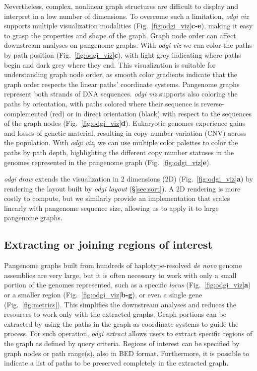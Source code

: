 \documentclass{bioinfo}
\begin{document}
Nevertheless, complex, nonlinear graph structures are difficult to display and interpret in a low number of dimensions.
To overcome such a limitation, \textit{odgi viz} supports multiple visualization modalities (Fig.~\ref{fig:odgi_viz}\textbf{c-e}), making it easy to grasp the properties and shape of the graph.
Graph node order can affect downstream analyses on pangenome graphs.
With \textit{odgi viz} we can color the paths by path position (Fig.~\ref{fig:odgi_viz}\textbf{c}), with light grey indicating where paths begin and dark grey where they end.
This visualization is suitable for understanding graph node order, as smooth color gradients indicate that the graph order respects the linear paths' coordinate systems.
Pangenome graphs represent both strands of DNA sequences.
\textit{odgi viz} supports also coloring the paths by orientation, with paths colored where their sequence is reverse-complemented (red) or in direct orientation (black) with respect to the sequences of the graph nodes (Fig.~\ref{fig:odgi_viz}\textbf{d}).
Eukaryotic genomes experience gains and losses of genetic material, resulting in copy number variation (CNV) across the population.
With \textit{odgi viz}, we can use multiple color palettes to color the paths by path depth, highlighting the different copy number statuses in the genomes represented in the pangenome graph (Fig.~\ref{fig:odgi_viz}\textbf{e}).

\textit{odgi draw} extends the visualization in 2 dimensions (2D)  (Fig.~\ref{fig:odgi_viz}\textbf{a}) by rendering the layout built by \textit{odgi layout} (\S\ref{sec:sort}).
A 2D rendering is more costly to compute, but we similarly provide an implementation that scales linearly with pangenome sequence size, allowing us to apply it to large pangenome graphs.


\subsection{Extracting or joining regions of interest}
\label{sec:extract}

Pangenome graphs built from hundreds of haplotype-resolved \textit{de novo} genome assemblies are very large, but it is often necessary to work with only a small portion of the genomes represented,
such as a specific \textit{locus} (Fig.~\ref{fig:odgi_viz}\textbf{a}) or a smaller region (Fig.~\ref{fig:odgi_viz}\textbf{b-g}), or even a single gene (Fig.~\ref{fig:metrics}).
This simplifies the downstream analyses and reduces the resources to work only with the extracted graphs.
Graph portions can be extracted by using the paths in the graph as coordinate systems to guide the process. For such operation, \textit{odgi extract} allows users to extract specific regions of the graph as defined by query criteria.
Regions of interest can be specified by graph nodes or path range(s), also in BED format. Furthermore, it is possible to indicate a list of paths to be preserved completely in the extracted graph.
\end{document}
